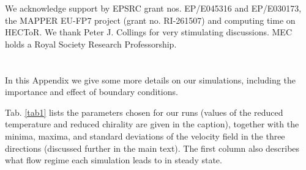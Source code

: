 \documentclass[aps,pre,reprint,superscriptaddress, twocolumn]{revtex4}
\begin{document}


\begin{acknowledgments}
We acknowledge support by EPSRC grant nos. EP/E045316 and EP/E030173, 
the MAPPER EU-FP7 project (grant no. RI-261507) and computing time on HECToR.
We thank Peter J. Collings for very stimulating discussions. 
MEC holds a Royal Society Research Professorship.
\end{acknowledgments}

\appendix
\section{}

In this Appendix we give some more details on our simulations,
including the importance and effect of boundary conditions. 

Tab. \ref{tab1} lists the parameters chosen for our runs (values of
the reduced temperature and reduced chirality are given in the caption),
together with the minima, maxima, and standard deviations of the velocity
field in the three directions (discussed further in the main text). 
The first column also describes what flow regime each simulation
leads to in steady state.
\end{document}
